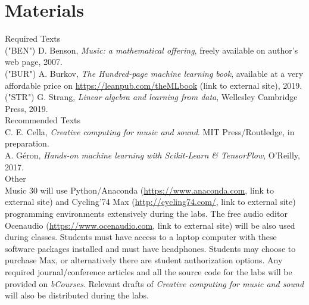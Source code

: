 \documentclass[letterpaper]{inzane_syllabus} %
\begin{document}
\vspace{0.5cm} %
\section{Materials}

{\color{myCOLOR} Required Texts}\\
("BEN") D. Benson, \textit{Music: a mathematical offering}, freely available on author's web page, 2007.\\
("BUR") A. Burkov, \textit{The Hundred-page machine learning book}, available at a very affordable price on \url{https://leanpub.com/theMLbook} (link to external site), 2019.\\
("STR") G. Strang, \textit{Linear algebra and learning from data}, Wellesley Cambridge Press, 2019.\\

{\color{myCOLOR} Recommended Texts}\\
C. E. Cella, \textit{Creative computing for music and sound}. MIT Press/Routledge, in preparation. \\
A. G\'eron, \textit{Hands-on machine learning with Scikit-Learn \& TensorFlow}, O'Reilly, 2017.\\

{\color{myCOLOR} Other}\\
Music 30 will use Python/Anaconda (\url{https://www.anaconda.com}, link to external site) and Cycling’74 Max (\url{http://cycling74.com/}, link to external site) programming environments extensively during the labs. The free audio editor Ocenaudio (\url{https://www.ocenaudio.com}, link to external site) will be also used during classes. Students must have access to a laptop computer with these software packages installed and must have headphones. Students may choose to purchase Max, or alternatively there are student authorization options. Any required journal/conference articles and all the source code for the labs will be provided on \emph{bCourses}. Relevant drafts of \emph{Creative computing for music and sound} will also be distributed during the labs. 

\vspace{0.5cm}
\end{document}
